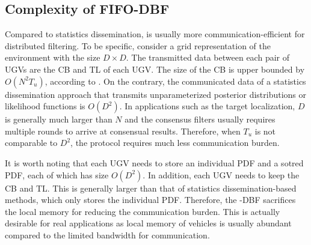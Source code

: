 	\subsection{Complexity of FIFO-DBF}
	Compared to statistics dissemination, {\proto} is usually more communication-efficient for distributed filtering. 
	To be specific, consider a grid representation of the environment with the size $D\times D$. %
	The transmitted data between each pair of UGVs are the CB and TL of each UGV.
	The size of the CB is upper bounded by $O(N^2T_u)$, according to .
	On the contrary, the communicated data of a statistics dissemination approach that transmits unparameterized posterior distributions or likelihood functions is $O(D^2)$.
	In applications such as the target localization, $D$ is generally much larger than $N$ and the consensus filters usually requires multiple rounds to arrive at consensual results.
	Therefore, when $T_u$ is not comparable to $D^2$, the {\proto} protocol requires much less communication burden.
	
	It is worth noting that each UGV needs to store an individual PDF and a sotred PDF, each of which has size $O(D^2)$. 
	In addition, each UGV needs to keep the CB and TL.
	This is generally larger than that of statistics dissemination-based methods, which only stores the individual PDF.
	Therefore, the \proto-DBF sacrifices the local memory for reducing the communication burden. 
	This is actually desirable for real applications as local memory of vehicles is usually abundant compared to the limited bandwidth for communication.
	
